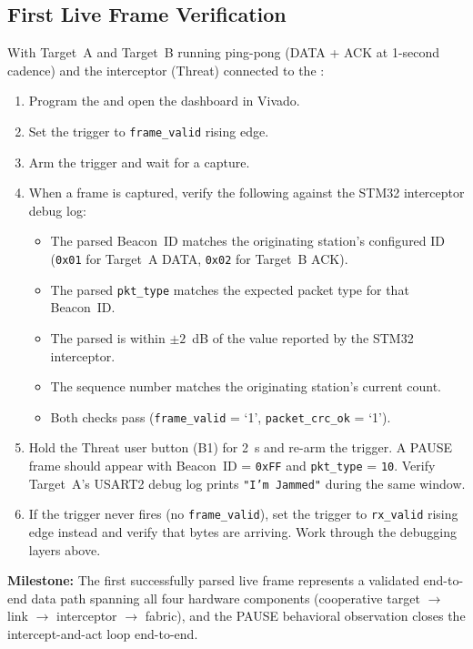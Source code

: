 \documentclass[11pt,letterpaper]{article}
\begin{document}
	\subsection{First Live Frame Verification}

	\begin{tcolorbox}[infobox={Exercise: First Frame on Hardware}]
		With Target~A and Target~B running ping-pong (DATA + ACK at 1-second cadence) and the interceptor (Threat) connected to the \FPGA{}:
		\begin{enumerate}
			\item Program the \FPGA{} and open the \ILA{} dashboard in Vivado.
			\item Set the \ILA{} trigger to \texttt{frame\_valid} rising edge.
			\item Arm the trigger and wait for a capture.
			\item When a frame is captured, verify the following against the STM32 interceptor debug log:
			\begin{itemize}
				\item The parsed Beacon~ID matches the originating station's configured ID (\texttt{0x01} for Target~A DATA, \texttt{0x02} for Target~B ACK).
				\item The parsed \texttt{pkt\_type} matches the expected packet type for that Beacon~ID.
				\item The parsed \RSSI{} is within $\pm 2$~dB of the value reported by the STM32 interceptor.
				\item The sequence number matches the originating station's current count.
				\item Both \CRC{} checks pass (\texttt{frame\_valid} = `1', \texttt{packet\_crc\_ok} = `1').
			\end{itemize}
			\item Hold the Threat user button (B1) for 2~s and re-arm the trigger. A PAUSE frame should appear with Beacon~ID = \texttt{0xFF} and \texttt{pkt\_type} = \texttt{10}. Verify Target~A's USART2 debug log prints \texttt{"I'm Jammed"} during the same window.
			\item If the trigger never fires (no \texttt{frame\_valid}), set the trigger to \texttt{rx\_valid} rising edge instead and verify that bytes are arriving. Work through the debugging layers above.
		\end{enumerate}
		\textbf{Milestone:} The first successfully parsed live frame represents a validated end-to-end data path spanning all four hardware components (cooperative target \MCU{} $\rightarrow$ \RF{} link $\rightarrow$ interceptor \MCU{} $\rightarrow$ \FPGA{} fabric), and the PAUSE behavioral observation closes the intercept-and-act loop end-to-end.
	\end{tcolorbox}
\end{document}
